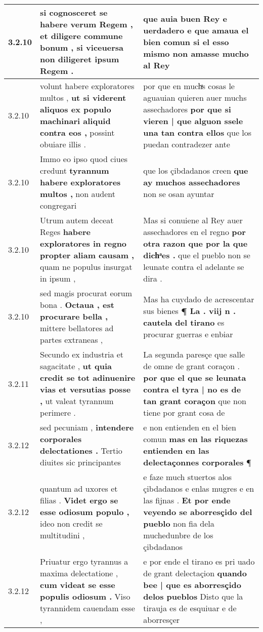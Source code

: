 \begin{tabular}{|p{1cm}|p{6.5cm}|p{6.5cm}|}
3.2.10 & si cognosceret se habere verum Regem , \textbf{ et diligere commune bonum , } si viceuersa non diligeret ipsum Regem . & que auia buen Rey e uerdadero \textbf{ e que amaua el bien comun } si el esso mismo non amasse mucho al Rey \\\hline
3.2.10 & volunt habere exploratores multos , \textbf{ ut si viderent aliquos ex populo machinari aliquid contra eos , } possint obuiare illis . & por que en muchͣs cosas le aguauian quieren auer muchs assechadores \textbf{ por que si vieren | que alguon ssele una tan contra ellos } que los puedan contradezer ante \\\hline
3.2.10 & Immo eo ipso quod ciues credunt \textbf{ tyrannum habere exploratores multos , } non audent congregari & que los çibdadanos creen \textbf{ que ay muchos assechadores } non se osan ayuntar \\\hline
3.2.10 & Utrum autem deceat Reges \textbf{ habere exploratores in regno propter aliam causam , } quam ne populus insurgat in ipsum , & Mas si conuiene al Rey auer assechadores en el regno \textbf{ por otra razon que por la que dichͣes . } que el pueblo non se leunate contra el adelante se dira . \\\hline
3.2.10 & sed magis procurat eorum bona . \textbf{ Octaua , est procurare bella , } mittere bellatores ad partes extraneas , & Mas ha cuydado de acrescentar sus bienes \textbf{ ¶ La . viij n . cautela del tirano } es procurar guerras e enbiar \\\hline
3.2.11 & Secundo ex industria et sagacitate , \textbf{ ut quia credit se tot adinuenire vias et versutias posse , } ut valeat tyrannum perimere . & La segunda paresçe que salle de omne de grant coraçon . \textbf{ por que el que se leunata contra el tyra | no es de tan grant coraçon } que non tiene por grant cosa de \\\hline
3.2.12 & sed pecuniam , \textbf{ intendere corporales delectationes . } Tertio diuites sic principantes & e non entienden en el bien comun \textbf{ mas en las riquezas entienden en las delectaçonnes corporales } ¶ \\\hline
3.2.12 & quantum ad uxores et filias . \textbf{ Videt ergo se esse odiosum populo , } ideo non credit se multitudini , & e faze much stuertos alos çibdadanos e enlas mugres e en las fijnas . \textbf{ Et por ende veyendo se aborresçido del pueblo } non fia dela muchedunbre de los çibdadanos \\\hline
3.2.12 & Priuatur ergo tyrannus a maxima delectatione , \textbf{ cum videat se esse populis odiosum . } Viso tyrannidem cauendam esse , & e por ende el tirano es pri uado de grant delectaçion \textbf{ quando bee | que es aborresçido delos pueblos } Disto que la tirauja es de esquiuar e de aborresçer \\\hline

\end{tabular}
